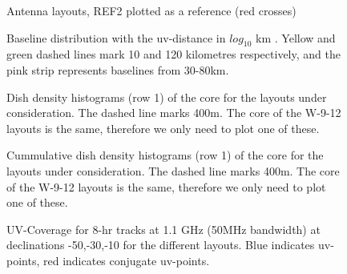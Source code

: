 \documentclass[sfheadings,a4paper,times,9pt,floats,floatfix]{article}
\begin{document}
\begin{figure}[H]
 \tiny{}
 \caption{Antenna layouts, REF2 plotted as a reference (red crosses)}\label{fig:lay}
\end{figure}
\begin{figure}[H]
 \tiny{}
 \caption{Baseline distribution with the uv-distance in $log_{10}$ km . Yellow and green dashed lines mark 10 and 120
kilometres respectively, and the pink strip represents baselines from 30-80km.}\label{fig:hist}
\end{figure}
\begin{figure}[H]
 \centering
 
 \caption{Dish density histograms (row 1) of the core for the layouts under consideration. The dashed line marks 400m. The core of
the W-9-12 layouts is the same, therefore we only need to plot one of these.}
\end{figure}
\begin{figure}[H]
 \centering
 
 \caption{Cummulative dish density histograms (row 1) of the core for the layouts under consideration. The dashed line marks 400m.
The core of the W-9-12 layouts is the same, therefore we only need to plot one of these.}
\end{figure}
\begin{figure}[H]
 \tiny{}
 \caption{UV-Coverage for 8-hr tracks at 1.1 GHz (50MHz bandwidth) at declinations -50,-30,-10 for the different layouts. Blue
indicates uv-points, red indicates conjugate uv-points.}\label{fig:uvcov}
\end{figure}
\end{document}

